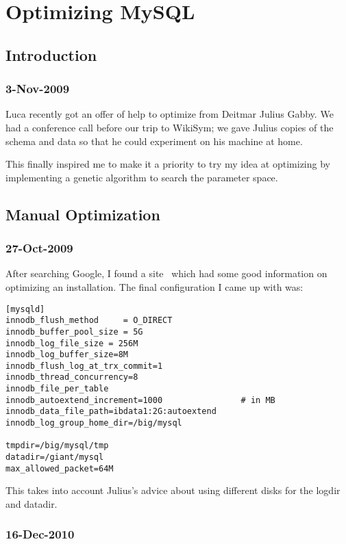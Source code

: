 \chapter{Optimizing MySQL}

\section{Introduction}

\subsection{3-Nov-2009}

Luca recently got an offer of help to optimize \mysql from Deitmar Julius Gabby.
We had a conference call before our trip to WikiSym; we gave Julius copies
of the schema and data so that he could experiment on his machine at home.

This finally inspired me to make it a priority to try my idea at optimizing
\mysql by implementing a genetic algorithm to search the parameter space.


\section{Manual Optimization}

\subsection{27-Oct-2009}

After searching Google, I found a site~\cite{InnodbOpt} which had some
good information on optimizing an  installation.
The final configuration I came up with was:
\begin{verbatim}
[mysqld]
innodb_flush_method     = O_DIRECT
innodb_buffer_pool_size = 5G
innodb_log_file_size = 256M
innodb_log_buffer_size=8M
innodb_flush_log_at_trx_commit=1
innodb_thread_concurrency=8
innodb_file_per_table
innodb_autoextend_increment=1000                # in MB
innodb_data_file_path=ibdata1:2G:autoextend
innodb_log_group_home_dir=/big/mysql

tmpdir=/big/mysql/tmp
datadir=/giant/mysql
max_allowed_packet=64M
\end{verbatim}
This takes into account Julius's advice about using different disks
for the logdir and datadir.

\subsection{16-Dec-2010}

